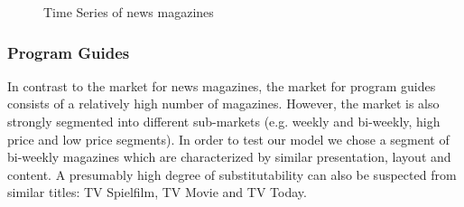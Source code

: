 \documentclass[12pt,a4paper,notitlepage]{article}
\begin{document}
\begin{figure}[H]\centering
\caption{Time Series of news magazines}
	\label{fig_fss}
\end{figure}



\subsubsection{Program Guides}

In contrast to the market for news magazines, the market for program guides consists of a relatively high number of magazines. However, the market is also strongly segmented into different sub-markets (e.g. weekly and bi-weekly, high price and low price segments). In order to test our model we chose a segment of bi-weekly magazines which are characterized by similar presentation, layout and content. A presumably high degree of substitutability can also be suspected from similar titles: TV Spielfilm, TV Movie and TV Today.  
\end{document}
